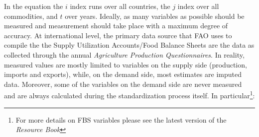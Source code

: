 \documentclass[]{article}
\let\rmarkdownfootnote\footnote%
\def\footnote{\protect\rmarkdownfootnote}
\begin{document}
In the equation the \(i\) index runs over all countries, the \(j\) index
over all commodities, and \(t\) over years. Ideally, as many variables
as possible should be measured and measurement should take place with a
maximum degree of accuracy. At international level, the primary data
source that FAO uses to compile the the Supply Utilization Accounts/Food
Balance Sheets are the data as collected through the annual
\emph{Agriculture Production Questionnaires}. In reality, measured
values are mostly limited to variables on the supply side (production,
imports and exports), while, on the demand side, most estimates are
imputed data. Moreover, some of the variables on the demand side are
never measured and are always calculated during the standardization
process itself. In particular\footnote{For more details on FBS variables
  please see the latest version of the \emph{Resource Book}}:
\end{document}
